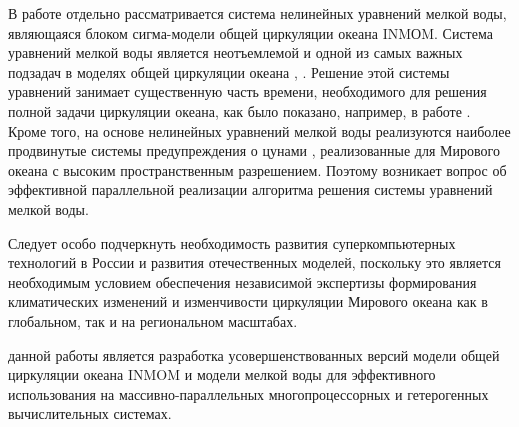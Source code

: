 В работе отдельно рассматривается система нелинейных уравнений мелкой воды,
являющаяся блоком сигма-модели общей циркуляции океана INMОM.
Система уравнений мелкой воды является неотъемлемой и одной из самых важных подзадач в моделях общей циркуляции океана \cite{ROMS2005}, \cite{Ibraev2015}.
Решение этой системы уравнений занимает существенную часть времени, необходимого для решения полной задачи циркуляции океана,
как было показано, например, в работе \cite{ChaplyginINMOM2017}.
Кроме того, на основе нелинейных уравнений мелкой воды реализуются наиболее продвинутые системы
предупреждения о цунами \cite{TUNAMI}, реализованные для Мирового океана с высоким пространственным разрешением.
Поэтому возникает вопрос об эффективной параллельной реализации алгоритма решения системы уравнений мелкой воды.

Следует особо подчеркнуть необходимость развития суперкомпьютерных технологий в России и развития отечественных моделей, поскольку это является необходимым условием обеспечения независимой экспертизы формирования климатических изменений и изменчивости циркуляции Мирового океана как в глобальном, так и на региональном масштабах.


{\aim} данной работы является разработка усовершенствованных версий модели общей циркуляции океана INMOM и модели мелкой воды для эффективного использования на массивно-параллельных многопроцессорных и гетерогенных вычислительных системах.


